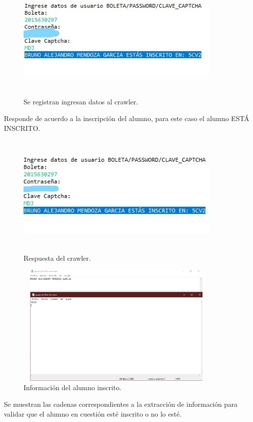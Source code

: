 	\begin{figure}[hbt!]
		\centering
		\includegraphics[width=10cm, height=6cm]{Imagenes/Crawler/Datoslogininscrito}
		\caption{Se registran ingresan datos al crawler.}
		\label{datoslogininscrito}
	\end{figure}
	
	\noindent Responde de acuerdo a la inscripción del alumno, para este caso el alumno ESTÁ INSCRITO.
	
	\begin{figure}[hbt!]
		\centering
		\includegraphics[width=10cm, height=6cm]{Imagenes/Crawler/Logininscrito}
		\caption{Respuesta del crawler.}
		\label{logininscrito}
	\end{figure}
	
	\begin{figure} [hbt!]
		\centering
		\includegraphics[width=10cm, height=6cm]{Imagenes/Crawler/Infologininscrito}
		\caption{Información del alumno inscrito.}
		\label{infologininscrito}
	\end{figure}
	\noindent Se muestran las cadenas correspondientes a la extracción de información para validar que el alumno en cuestión esté inscrito o no lo esté.
	

